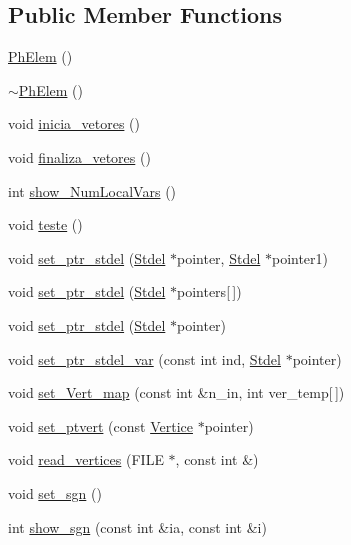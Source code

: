 \subsection*{Public Member Functions}
\begin{DoxyCompactItemize}
\item 
\hyperlink{classPhElem_a2c8af1714574b8f72159eacb029101ba}{Ph\+Elem} ()
\item 
\hyperlink{classPhElem_aa08b43c5935f16d4093f3b9b05e06898}{$\sim$\+Ph\+Elem} ()
\item 
void \hyperlink{classPhElem_a04e36bca293dabc7a88fe2ad2d527dc4}{inicia\+\_\+vetores} ()
\item 
void \hyperlink{classPhElem_aa7e0f33c0d15b74e1dae945e35626cc7}{finaliza\+\_\+vetores} ()
\item 
int \hyperlink{classPhElem_a5288b2eba55ffa37f1a9866a516f6886}{show\+\_\+\+Num\+Local\+Vars} ()
\item 
void \hyperlink{classPhElem_a9742fa2313cf25a24ae9c5602bd75ac0}{teste} ()
\item 
void \hyperlink{classPhElem_af2796c868709214bb9b151b47d7d471f}{set\+\_\+ptr\+\_\+stdel} (\hyperlink{classStdel}{Stdel} $\ast$pointer, \hyperlink{classStdel}{Stdel} $\ast$pointer1)
\item 
void \hyperlink{classPhElem_aaf841c14455a54e0f33e2c74bef979fd}{set\+\_\+ptr\+\_\+stdel} (\hyperlink{classStdel}{Stdel} $\ast$pointers\mbox{[}$\,$\mbox{]})
\item 
void \hyperlink{classPhElem_a78130ee8d7d6ecf59f231dbd436e9081}{set\+\_\+ptr\+\_\+stdel} (\hyperlink{classStdel}{Stdel} $\ast$pointer)
\item 
void \hyperlink{classPhElem_a52fdbcf2283aacd8fdf9672018d74e4a}{set\+\_\+ptr\+\_\+stdel\+\_\+var} (const int ind, \hyperlink{classStdel}{Stdel} $\ast$pointer)
\item 
void \hyperlink{classPhElem_a134cbfd28fc238a24156ab1c24fc31c0}{set\+\_\+\+Vert\+\_\+map} (const int \&n\+\_\+in, int ver\+\_\+temp\mbox{[}$\,$\mbox{]})
\item 
void \hyperlink{classPhElem_a8ed472a9e135b1e16b962c14df8f2225}{set\+\_\+ptvert} (const \hyperlink{structVertice}{Vertice} $\ast$pointer)
\item 
void \hyperlink{classPhElem_a8abc7be8120f4192de31e0cfb32ac968}{read\+\_\+vertices} (F\+I\+LE $\ast$, const int \&)
\item 
void \hyperlink{classPhElem_a03505c861fbcdb7cf8faec9fe5eea088}{set\+\_\+sgn} ()
\item 
int \hyperlink{classPhElem_ab271550e1373e11cb0b1f62d3e1ea428}{show\+\_\+sgn} (const int \&ia, const int \&i)

\end{DoxyCompactItemize}
